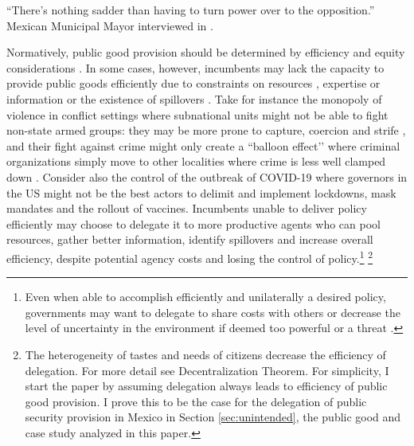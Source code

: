 \documentclass[12pt]{amsart}
\numberwithin{equation}{section}
\theoremstyle{definition}
\theoremstyle{definition}
\theoremstyle{definition}
\begin{document}
\begin{flushright}
	``There's nothing sadder than having to turn power over to the opposition.'' \\
	 Mexican Municipal Mayor interviewed in \citet{grindle_2009}.  
\end{flushright}
\bigskip

     
Normatively, public good provision should be determined by efficiency and equity considerations \citep{oates_1972, Musgrave_1959, Musgrave_1983, gramlich_1977}. In some cases, however, incumbents may lack the capacity to provide public goods efficiently due to constraints on resources \citep{Moravcsik_2000}, expertise or information \citet{Rodrick_1996} or the existence of spillovers \citep{oates_1972,  Besley_case_1995}. Take for instance the monopoly of violence in conflict settings where subnational units might not be able to fight non-state armed groups: they may be more prone to capture, coercion and strife \citet{chacon_2018}, and their fight against crime might only create a ``balloon effect’’ where criminal organizations simply move to other localities where crime is less well clamped down \citep{shirk_wallman_2015}. Consider also the control of the outbreak of COVID-19 where governors in the US might not be the best actors to delimit and implement lockdowns, mask mandates and the rollout of vaccines. Incumbents unable to deliver policy efficiently may choose to delegate it to more productive agents who can pool resources, gather better information, identify spillovers and increase overall efficiency, despite potential agency costs and losing the control of policy.\footnote{Even when able to accomplish efficiently and unilaterally a desired policy, governments may want to delegate to share costs with others \citep{Moravcsik_2000} or decrease the level of uncertainty in the environment if deemed too powerful or a threat \citep{lake_2009, milner_2011}.} \footnote{The heterogeneity of tastes and needs of citizens decrease the efficiency of delegation. For more detail see \citet{oates_1972} Decentralization Theorem. For simplicity, I start the paper by assuming delegation always leads to efficiency of public good provision. I prove this to be the case for the delegation of public security provision in Mexico in Section \ref{sec:unintended}, the public good and case study analyzed in this paper.} 
         
\end{document}
